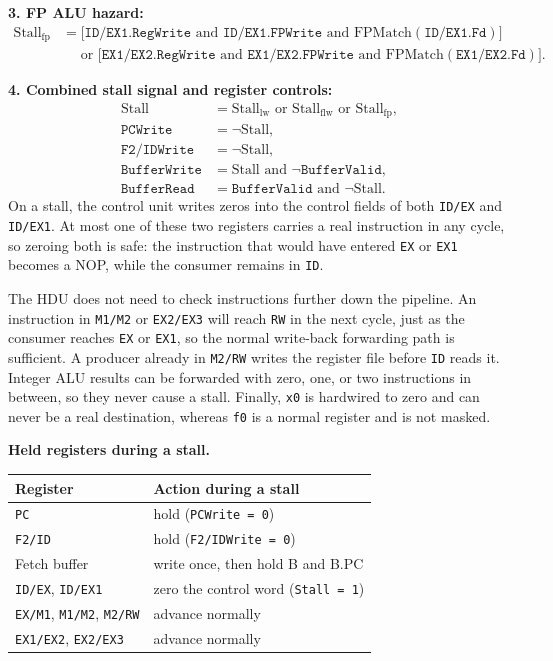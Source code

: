 \documentclass[11pt, a4paper]{article}
\begin{document}
\textbf{3. FP ALU hazard:}
\begin{align*}
\text{Stall}_{\text{fp}} &=
\big[\texttt{ID/EX1.RegWrite}\text{ and }\texttt{ID/EX1.FPWrite}
\text{ and }\text{FPMatch}(\texttt{ID/EX1.Fd})\big]\\
&\quad\text{ or }\big[\texttt{EX1/EX2.RegWrite}\text{ and }\texttt{EX1/EX2.FPWrite}
\text{ and }\text{FPMatch}(\texttt{EX1/EX2.Fd})\big].
\end{align*}

\textbf{4. Combined stall signal and register controls:}
\begin{align*}
\text{Stall} &= \text{Stall}_{\text{lw}}\text{ or }\text{Stall}_{\text{flw}}\text{ or }\text{Stall}_{\text{fp}},\\
\texttt{PCWrite} &= \neg\text{Stall},\\
\texttt{F2/IDWrite} &= \neg\text{Stall},\\
\texttt{BufferWrite} &= \text{Stall}\text{ and }\neg\texttt{BufferValid},\\
\texttt{BufferRead} &= \texttt{BufferValid}\text{ and }\neg\text{Stall}.
\end{align*}
On a stall, the control unit writes zeros into the control fields of both \texttt{ID/EX} and \texttt{ID/EX1}. At most one of these two registers carries a real instruction in any cycle, so zeroing both is safe: the instruction that would have entered \texttt{EX} or \texttt{EX1} becomes a NOP, while the consumer remains in \texttt{ID}.

The HDU does not need to check instructions further down the pipeline. An instruction in \texttt{M1/M2} or \texttt{EX2/EX3} will reach \texttt{RW} in the next cycle, just as the consumer reaches \texttt{EX} or \texttt{EX1}, so the normal write-back forwarding path is sufficient. A producer already in \texttt{M2/RW} writes the register file before \texttt{ID} reads it. Integer ALU results can be forwarded with zero, one, or two instructions in between, so they never cause a stall. Finally, \texttt{x0} is hardwired to zero and can never be a real destination, whereas \texttt{f0} is a normal register and is not masked.

\textbf{Held registers during a stall.}
\begin{center}
\footnotesize
\setlength{\tabcolsep}{6pt}
\begin{tabular}{@{}l l@{}}
\toprule
\textbf{Register} & \textbf{Action during a stall} \\
\midrule
\texttt{PC} & hold (\texttt{PCWrite = 0}) \\
\texttt{F2/ID} & hold (\texttt{F2/IDWrite = 0}) \\
Fetch buffer & write once, then hold B and B.PC \\
\texttt{ID/EX}, \texttt{ID/EX1} & zero the control word (\texttt{Stall = 1}) \\
\texttt{EX/M1}, \texttt{M1/M2}, \texttt{M2/RW} & advance normally \\
\texttt{EX1/EX2}, \texttt{EX2/EX3} & advance normally \\
\bottomrule
\end{tabular}
\end{center}
\end{document}
